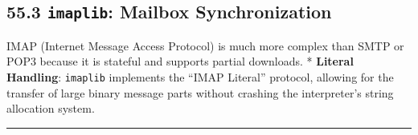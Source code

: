 \hypertarget{imaplib-mailbox-synchronization}{%
\subsection{\texorpdfstring{55.3 \texttt{imaplib}: Mailbox
Synchronization}{55.3 imaplib: Mailbox Synchronization}}\label{imaplib-mailbox-synchronization}}

IMAP (Internet Message Access Protocol) is much more complex than SMTP
or POP3 because it is stateful and supports partial downloads. *
\textbf{Literal Handling}: \passthrough{\lstinline!imaplib!} implements
the ``IMAP Literal'' protocol, allowing for the transfer of large binary
message parts without crashing the interpreter's string allocation
system.

\begin{center}\rule{0.5\linewidth}{0.5pt}\end{center}
